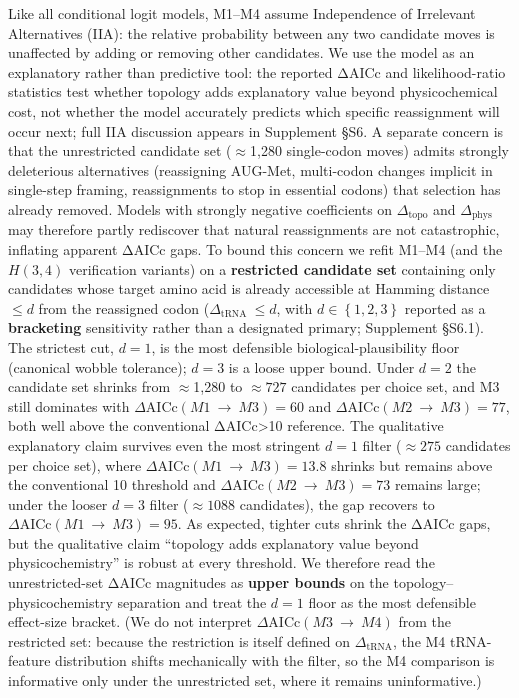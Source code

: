 \documentclass[preprint,11pt,authoryear,a4paper]{elsarticle}
\begin{document}
Like all conditional logit models, M1--M4 assume Independence of
Irrelevant Alternatives (IIA): the relative probability between any two
candidate moves is unaffected by adding or removing other candidates. We
use the model as an explanatory rather than predictive tool: the
reported ΔAICc and likelihood-ratio statistics test whether topology
adds explanatory value beyond physicochemical cost, not whether the
model accurately predicts which specific reassignment will occur next;
full IIA discussion appears in Supplement §S6. A separate concern is
that the unrestricted candidate set (\(\approx\)1,280 single-codon
moves) admits strongly deleterious alternatives (reassigning AUG-Met,
multi-codon changes implicit in single-step framing, reassignments to
stop in essential codons) that selection has already removed. Models
with strongly negative coefficients on \(\Delta_{\text{topo}}\) and
\(\Delta_{\text{phys}}\) may therefore partly rediscover that natural
reassignments are not catastrophic, inflating apparent ΔAICc gaps. To
bound this concern we refit M1--M4 (and the \(H(3,4)\) verification
variants) on a \textbf{restricted candidate set} containing only
candidates whose target amino acid is already accessible at Hamming
distance \(\leq d\) from the reassigned codon
(\(\Delta_{\text{tRNA }} \leq d\), with \(d \in \left\{ 1,2,3 \right\}\)
reported as a \textbf{bracketing} sensitivity rather than a designated
primary; Supplement §S6.1). The strictest cut, \(d = 1\), is the most
defensible biological-plausibility floor (canonical wobble tolerance);
\(d = 3\) is a loose upper bound. Under \(d = 2\) the candidate set
shrinks from \(\approx\)1,280 to \(\approx 727\) candidates per choice
set, and M3 still dominates with
\(\Delta\text{AICc}(M1\  \rightarrow \ M3) = 60\) and
\(\Delta\text{AICc}(M2\  \rightarrow \ M3) = 77\), both well above the
conventional ΔAICc\textgreater10 reference. The qualitative explanatory
claim survives even the most stringent \(d = 1\) filter (\(\approx 275\)
candidates per choice set), where
\(\Delta\text{AICc}(M1\  \rightarrow \ M3) = 13.8\) shrinks but remains
above the conventional 10 threshold and
\(\Delta\text{AICc}(M2\  \rightarrow \ M3) = 73\) remains large; under
the looser \(d = 3\) filter (\(\approx 1088\) candidates), the gap
recovers to \(\Delta\text{AICc}(M1\  \rightarrow \ M3) = 95\). As
expected, tighter cuts shrink the ΔAICc gaps, but the qualitative claim
``topology adds explanatory value beyond physicochemistry'' is robust at
every threshold. We therefore read the unrestricted-set ΔAICc magnitudes
as \textbf{upper bounds} on the topology--physicochemistry separation
and treat the \(d = 1\) floor as the most defensible effect-size
bracket. (We do not interpret
\(\Delta\text{AICc}(M3\  \rightarrow \ M4)\) from the restricted set:
because the restriction is itself defined on \(\Delta_{\text{tRNA}}\),
the M4 tRNA-feature distribution shifts mechanically with the filter, so
the M4 comparison is informative only under the unrestricted set, where
it remains uninformative.)
\end{document}
